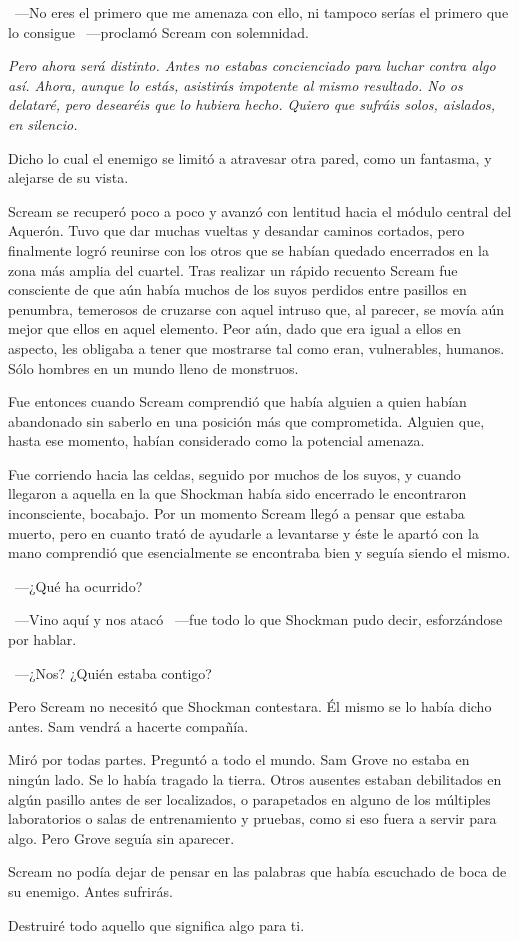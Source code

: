~---No eres el primero que me amenaza con ello, ni tampoco serías el primero que lo consigue ~---proclamó Scream con solemnidad.

\emph{Pero ahora será distinto. Antes no estabas concienciado para luchar contra algo así. Ahora, aunque lo estás, asistirás impotente al mismo resultado. No os delataré, pero desearéis que lo hubiera hecho. Quiero que sufráis solos, aislados, en silencio.}

Dicho lo cual el enemigo se limitó a atravesar otra pared, como un fantasma, y alejarse de su vista.

Scream se recuperó poco a poco y avanzó con lentitud hacia el módulo central del Aquerón. Tuvo que dar muchas vueltas y desandar caminos cortados, pero finalmente logró reunirse con los otros que se habían quedado encerrados en la zona más amplia del cuartel. Tras realizar un rápido recuento Scream fue consciente de que aún había muchos de los suyos perdidos entre pasillos en penumbra, temerosos de cruzarse con aquel intruso que, al parecer, se movía aún mejor que ellos en aquel elemento. Peor aún, dado que era igual a ellos en aspecto, les obligaba a tener que mostrarse tal como eran, vulnerables, humanos. Sólo hombres en un mundo lleno de monstruos.

Fue entonces cuando Scream comprendió que había alguien a quien habían abandonado sin saberlo en una posición más que comprometida. Alguien que, hasta ese momento, habían considerado como la potencial amenaza.

Fue corriendo hacia las celdas, seguido por muchos de los suyos, y cuando llegaron a aquella en la que Shockman había sido encerrado le encontraron inconsciente, bocabajo. Por un momento Scream llegó a pensar que estaba muerto, pero en cuanto trató de ayudarle a levantarse y éste le apartó con la mano comprendió que esencialmente se encontraba bien y seguía siendo el mismo.

~---¿Qué ha ocurrido?

~---Vino aquí y nos atacó ~---fue todo lo que Shockman pudo decir, esforzándose por hablar.

~---¿Nos? ¿Quién estaba contigo?

Pero Scream no necesitó que Shockman contestara. Él mismo se lo había dicho antes. Sam vendrá a hacerte compañía.

Miró por todas partes. Preguntó a todo el mundo. Sam Grove no estaba en ningún lado. Se lo había tragado la tierra. Otros ausentes estaban debilitados en algún pasillo antes de ser localizados, o parapetados en alguno de los múltiples laboratorios o salas de entrenamiento y pruebas, como si eso fuera a servir para algo. Pero Grove seguía sin aparecer.

Scream no podía dejar de pensar en las palabras que había escuchado de boca de su enemigo. Antes sufrirás.

Destruiré todo aquello que significa algo para ti.

\endinput
